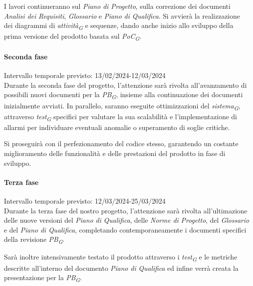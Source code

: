 \vspace{0.2cm}

I lavori continueranno sul \textit{Piano di Progetto}, sulla correzione dei documenti \textit{Analisi dei Requisiti}, \textit{Glossario} e \textit{Piano di Qualifica}. Si avvierà la realizzazione dei diagrammi di \textit{attività}\textsubscript{\textit{G}} e sequenze, dando anche inizio allo sviluppo della prima versione del prodotto basata sul \textit{PoC}\textsubscript{\textit{G}}.

\paragraph{Seconda fase}
Intervallo temporale previsto: 13/02/2024-12/03/2024
\\ 
\vspace{0.2cm} 
Durante la seconda fase del progetto, l'attenzione sarà rivolta all’avanzamento di possibili nuovi documenti per la \textit{PB}\textsubscript{\textit{G}}, insieme alla continuazione dei documenti inizialmente avviati. In parallelo, saranno eseguite ottimizzazioni del \textit{sistema}\textsubscript{\textit{G}}, attraverso \textit{test}\textsubscript{\textit{G}} specifici per valutare la sua scalabilità e l'implementazione di allarmi per individuare eventuali anomalie o superamento di soglie critiche.

Si proseguirà con il perfezionamento del codice stesso, garantendo un costante miglioramento delle funzionalità e delle prestazioni del prodotto in fase di sviluppo.

\paragraph{Terza fase}
Intervallo temporale previsto: 12/03/2024-25/03/2024\\ 
\vspace{0.2cm} 
Durante la terza fase del nostro progetto, l'attenzione sarà rivolta all'ultimazione delle nuove versioni del \textit{Piano di Qualifica}, delle \textit{Norme di Progetto}, del \textit{Glossario} e del \textit{Piano di Qualifica}, completando contemporaneamente i documenti specifici della revisione \textit{PB}\textsubscript{\textit{G}}.

Sarà inoltre intensivamente testato il prodotto attraverso i \textit{test}\textsubscript{\textit{G}} e le metriche descritte all'interno del documento \textit{Piano di Qualifica} ed infine verrà creata la presentazione per la \textit{PB}\textsubscript{\textit{G}}.



